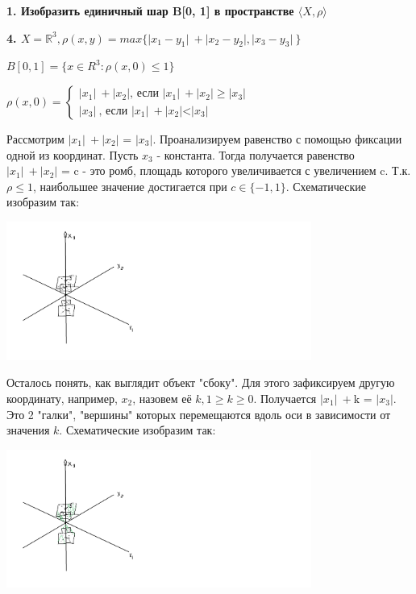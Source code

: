 \documentclass{article}
\begin{document}
\noindent \textbf{1. Изобразить единичный шар B[0, 1] в пространстве $\langle X, \rho \rangle$}

\textbf{4. $X = \mathbb{R}^3, \rho(x,y) = max\{\lvert x_1 - y_1 \rvert\ + \lvert x_2 - y_2 \rvert, \lvert x_3 - y_3 \rvert\ \}$}

$B[0,1] = \{x \in R^3: \rho(x,0) \leqslant 1 \}$

$\rho(x, 0) =
\begin{cases}
    \lvert x_1 \rvert\ + \lvert x_2 \rvert \text{, если } \lvert x_1 \rvert\ + \lvert x_2 \rvert \geq \lvert x_3\rvert \\
    \lvert x_3 \rvert\ \text{, если } \lvert x_1 \rvert\ + \lvert x_2 \rvert \text{<} \lvert x_3\rvert 
\end{cases}$ 

Рассмотрим $\lvert x_1 \rvert\ + \lvert x_2 \rvert \text{ = } \lvert x_3\rvert$. Проанализируем равенство с помощью фиксации одной из координат. Пусть $x_3$ - константа. Тогда получается равенство $\lvert x_1 \rvert\ + \lvert x_2 \rvert \text{ = c} $ - это ромб, площадь которого увеличивается с увеличением c. Т.к. $\rho \leq 1$, наибольшее значение достигается при $c \in \{-1, 1\}$. Схематические изобразим так:

\includegraphics[width=100mm]{Quatreangeold}

Осталось понять, как выглядит объект "сбоку". Для этого зафиксируем другую координату, например, $x_2$, назовем её $k, 1 \geq k \geq 0$. Получается $\lvert x_1 \rvert\ + \text{k} \text{ = } \lvert x_3\rvert$. Это 2 "галки", "вершины" которых перемещаются вдоль оси в зависимости от значения $k$.
Схематические изобразим так:

\includegraphics[width=100mm]{Quatreange}
\end{document}
